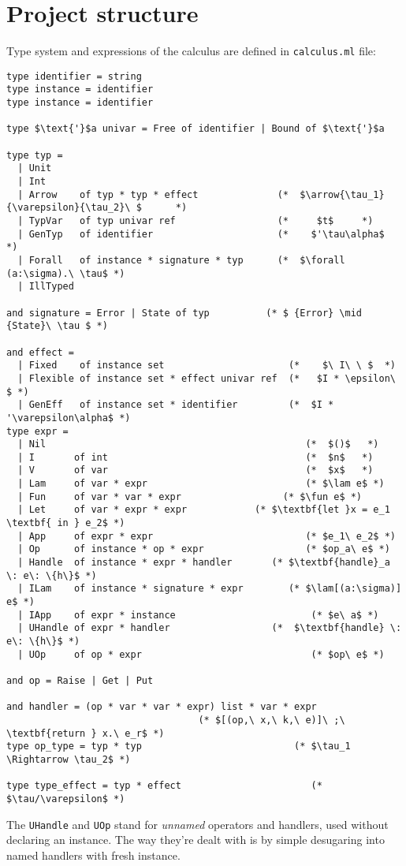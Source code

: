 \documentclass[declaration,shortabstract]{iithesis}
\theoremstyle{definition} \newtheorem{definition}{Definition}[section]
\newcommand{\arrow}[3]{{#1}\rightarrow_{#2}{#3}}
\newcommand{\lam}[1][x]{\ensuremath{\lambda #1.\:}}
\newcommand{\fun}[1][f,\:x]{\ensuremath{\textbf{fun } #1.\:}}
\begin{document}
\section{Project structure}
Type system and expressions of the calculus are defined in \texttt{calculus.ml} file:
\begin{lstlisting}
type identifier = string
type instance = identifier
type instance = identifier

type $\text{'}$a univar = Free of identifier | Bound of $\text{'}$a

type typ =
  | Unit
  | Int
  | Arrow    of typ * typ * effect              (*  $\arrow{\tau_1}{\varepsilon}{\tau_2}\ $      *)
  | TypVar   of typ univar ref                  (*     $t$     *)
  | GenTyp   of identifier                      (*    $'\tau\alpha$      *)
  | Forall   of instance * signature * typ      (*  $\forall (a:\sigma).\ \tau$ *)
  | IllTyped

and signature = Error | State of typ          (* $ {Error} \mid {State}\ \tau $ *)

and effect =
  | Fixed    of instance set                      (*    $\ I\ \ $  *)
  | Flexible of instance set * effect univar ref  (*   $I * \epsilon\ $ *)
  | GenEff   of instance set * identifier         (*  $I * '\varepsilon\alpha$ *)
type expr =
  | Nil                                              (*  $()$   *)
  | I       of int                                   (*  $n$   *)
  | V       of var                                   (*  $x$   *)
  | Lam     of var * expr                            (* $\lam e$ *)
  | Fun     of var * var * expr                  (* $\fun e$ *)
  | Let     of var * expr * expr            (* $\textbf{let }x = e_1 \textbf{ in } e_2$ *)
  | App     of expr * expr                           (* $e_1\ e_2$ *)
  | Op      of instance * op * expr                  (* $op_a\ e$ *)
  | Handle  of instance * expr * handler       (* $\textbf{handle}_a \: e\: \{h\}$ *)
  | ILam    of instance * signature * expr        (* $\lam[(a:\sigma)] e$ *)
  | IApp    of expr * instance                        (* $e\ a$ *)
  | UHandle of expr * handler                  (*  $\textbf{handle} \: e\: \{h\}$ *)
  | UOp     of op * expr                              (* $op\ e$ *)
  
and op = Raise | Get | Put

and handler = (op * var * var * expr) list * var * expr
                                  (* $[(op,\ x,\ k,\ e)]\ ;\ \textbf{return } x.\ e_r$ *)
type op_type = typ * typ                           (* $\tau_1 \Rightarrow \tau_2$ *)

type type_effect = typ * effect                       (* $\tau/\varepsilon$ *)
\end{lstlisting}
The \texttt{UHandle} and \texttt{UOp} stand for \textit{unnamed} operators and handlers,
used without declaring an instance.
The way they're dealt with is by simple desugaring into named handlers with
fresh instance.
\end{document}
